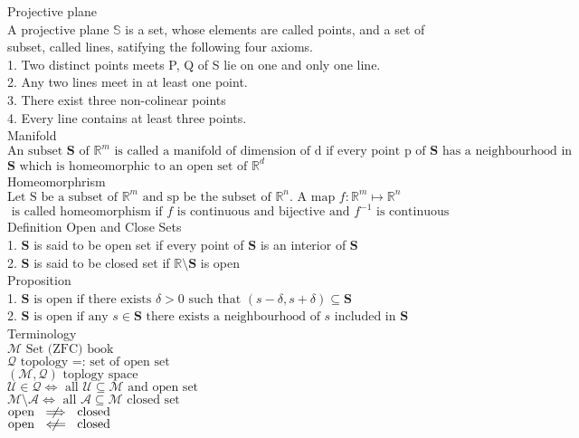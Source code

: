 \documentclass{book}
\begin{document}
\noindent
Projective plane\\
A projective plane $\mathbb{S}$ is a set, whose elements are called points, and a set of subset, called lines, satifying the following four axioms.\\
1. Two distinct points meets P, Q of S lie on one and only one line.\\ 
2. Any two lines meet in at least one point.\\
3. There exist three non-colinear points\\
4. Every line contains at least three points.\\

\noindent
Manifold\\
$\text{An subset }\mathbf{S} \text{ of } \mathbb{R}^{m} \text{ is called a manifold of dimension of d if every point p of }\mathbf{S} \text{ has a neighbourhood in }$
$\mathbf{S}\text{ which is homeomorphic to an open set of }\mathbb{R}^{d}$\\

\noindent
Homeomorphrism\\
$\text{Let S be a subset of }\mathbb{R}^{m} \text{ and sp be the subset of }\mathbb{R}^{n}. \text{ A map } \mathit{f}: \mathbb{R}^{m} \mapsto \mathbb{R}^{n}$\\
$\text{ is called homeomorphism if }\mathit{f} \text{ is continuous and bijective and }\mathit{f}^{-1} \text{ is continuous}$\\


\noindent
Definition Open and Close Sets\\
1. $\mathbf{S}$ is said to be open set if every point of $\mathbf{S}$ is an interior of $\mathbf{S}$\\
2. $\mathbf{S}$ is said to be closed set if $\mathbb{R}\setminus\mathbf{S}$ is open\\  

\noindent
Proposition\\
1. $\mathbf{S} \text{ is open if there exists } \delta > 0 \text{ such that } (\mathit{s} - \delta, \mathit{s} + \delta) \subseteq \mathbf{S}$\\
2. $\mathbf{S} \text{ is open if any }\mathit{s} \in \mathbf{S} \text{ there exists a neighbourhood of }\mathit{s} \text{ included in }\mathbf{S}$\\  


\noindent
Terminology\\
$\mathcal{M} \text{ Set (ZFC) book}$\\
$\mathcal{Q} \text{ topology =: set of open set}$\\
$(\mathcal{M}, \mathcal{Q}) \text{ toplogy space}$\\
$\mathcal{U} \in \mathcal{Q} \iff \text{ all } \mathcal{U} \subseteq \mathcal{M} \text{ and open set}$\\
$\mathcal{M} \setminus \mathcal{A} \iff   \text{ all }    \mathcal{A} \subseteq \mathcal{M} \text{ closed set}$\\
$\text{open } \centernot\implies \text{ closed}$\\
$\text{open } \centernot\impliedby \text{ closed}$\\
\end{document}
